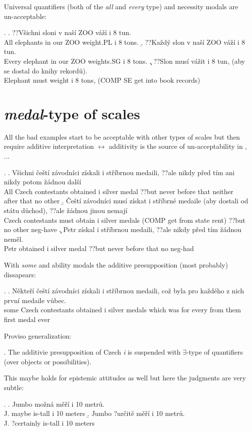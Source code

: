 \documentclass{article}
\begin{document}
Universal quantifiers (both of the \textit{all} and \textit{every} type) and necessity modals are un-acceptable:

\ex. \a. ??Všichni sloni v naší ZOO váží i 8 tun.\\
All elephants in our ZOO weight.PL i 8 tons.
\b. ??Každý slon v naší ZOO váží i 8 tun.\\
Every elephant in our ZOO weights.SG i 8 tons.
\c. ??Slon musí vážit i 8 tun, (aby se dostal do knihy rekordů).\\
Elephant must weight i 8 tons, (COMP SE get into book records)

\section{\textit{medal}-type of scales}

All the bad examples start to be acceptable with other types of scales but then require additive interpretation $\leftrightarrow$ additivity is the source of un-acceptability in \Last, ...

\ex. \a. Všichni čeští závodníci získali i stříbrnou medaili, ??ale nikdy před tím ani nikdy potom žádnou další\\
All Czech contestants obtained i silver medal ??but never before that neither after that no other
\b. Čeští závodníci musí získat i stříbrné medaile (aby dostali od státu důchod), ??ale žádnou jinou nemají\\
Czech contestants must obtain i silver medals (COMP get from state rent) ??but no other neg-have
\c. Petr získal i stříbrnou medaili, ??ale nikdy před tím žádnou neměl.\\
Petr obtained i silver medal ??but never before that no neg-had

With \textit{some} and ability modals the additive presupposition (most probably) dissapears:

\ex. \a. Někteří čeští závodníci získali i stříbrnou medaili, což byla pro každého z nich první medaile vůbec.\\
some Czech contestants obtained i silver medals which was for every from them first medal ever

Proviso generalization:

\ex. The additivie presupposition of Czech \textit{i} is suspended with $\exists$-type of quantifiers (over objects or possibilities).

This maybe holds for epistemic attitudes as well but here the judgments are very subtle:

\ex. \a. Jumbo možná měří i 10 metrů.\\
J. maybe is-tall i 10 meters
\b. Jumbo ?určitě měří i 10 metrů.\\
J. ?certainly is-tall i 10 meters
\end{document}
